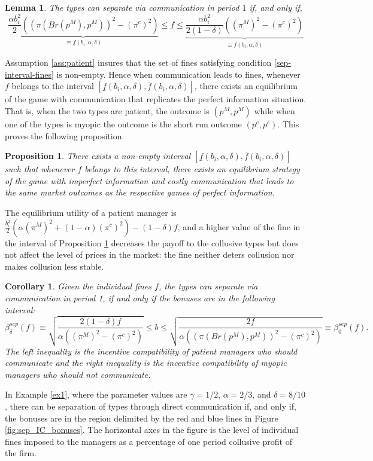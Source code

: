 \documentclass[]{article}
\newtheorem{lemma}{Lemma}
\newtheorem{proposition}{Proposition}
\newtheorem{corollary}{Corollary}
\begin{document}
\begin{lemma}\label{lem:com}
The types can separate via communication in period $1$ if, and only if,
\begin{equation}\label{sep-interval-fines}
\underbrace{\frac{\alpha b_i^2}{2 } ((\pi(Br(p^M),p^M))^2-(\pi^c)^2)}_{\equiv \underline{f}(b_i,\alpha,\delta)}\leq f \leq \underbrace{\frac{\alpha b_i^2}{2 (1-\delta) } ((\pi^M)^2-(\pi^c)^2)}_{\equiv \overline{f}(b_i,\alpha,\delta)}
\end{equation}
\end{lemma}
%
Assumption \eqref{ass:patient} insures that the set of fines satisfying condition \eqref{sep-interval-fines} is non-empty. Hence when communication leads to fines, whenever $f$ belongs to the interval $[\underline{f}(b_i, \alpha,\delta),\overline{f}(b_i, \alpha,\delta)]$, there exists an equilibrium of the game with communication that replicates the perfect information situation. That is, when the two types are patient, the outcome is $(p^M,p^M)$ while when one of the types is myopic the outcome is the short run outcome $(p^c,p^c)$. This proves the following proposition.
%
\begin{proposition}\label{prop:com}
There exists a non-empty interval $[\underline f(b_i, \alpha,\delta),\overline f(b_i, \alpha,\delta)]$ such that whenever $f$ belongs to this interval, there exists an equilibrium strategy of the game with imperfect information and costly communication that leads to the same market outcomes as the respective games of perfect information.
\end{proposition}
%
The equilibrium utility of a patient manager is  $\frac{b_i^2}{2} \left(\alpha (\pi^M)^2+(1-\alpha)(\pi^c)^2\right)-(1-\delta)f$, and a higher value of the fine in the interval of Proposition \ref{prop:com} decreases the payoff to the collusive types but does not affect the level of prices in the market: the fine neither deters collusion nor makes collusion less stable.

\begin{corollary}\label{cor:sep_bonuses}
Given the individual fines $f$, the types can separate via communication in period 1, if and only if the bonuses are in the following interval:
\begin{equation}\label{interval-bonuses}
\beta^{sep}_\delta(f) \equiv \sqrt{ \frac{2 (1-\delta)  f}{\alpha ((\pi^M)^2-(\pi^c)^2)} } \leq b \leq \sqrt{ \frac{2  f}{\alpha ((\pi(Br(p^M),p^M))^2-(\pi^c)^2)} }\equiv \beta^{sep}_0(f).
\end{equation}
The left inequality is the incentive compatibility of patient managers who should communicate and the right inequality is the incentive compatibility of myopic managers who should not communicate.
\end{corollary}
%
In Example \ref{ex1}, where the parameter values are $\gamma=1/2$, $\alpha=2/3$, and $\delta=8/10$, there can be separation of types through direct communication if, and only if, the bonuses are in the region delimited by the red and blue lines in Figure \ref{fig:sep_IC_bonuses}. The horizontal axes in the figure is the level of individual fines imposed to the managers as a percentage of one period collusive profit of the firm.
\end{document}
